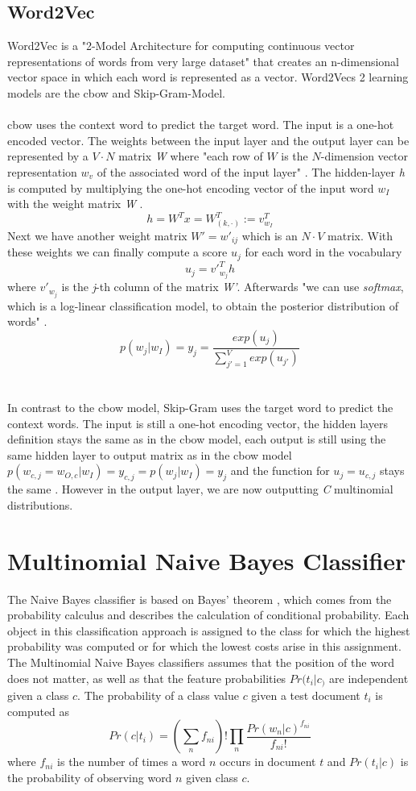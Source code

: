 \documentclass[a4paper, 11pt,titlepage,oneside,openany]{book}
\begin{document}
\subsection{Word2Vec}
Word2Vec is a "2-Model Architecture for computing continuous vector representations of words from very large dataset"\cite{effiecientestimation} that creates an n-dimensional vector space in which each word is represented as a vector. Word2Vecs 2 learning models are the \gls{cbow} and Skip-Gram-Model.\\
\\
\noindent \gls{cbow} uses the context word to predict the target word. The input is a one-hot encoded vector. The weights between the input layer and the output layer can be represented by a $V \cdot N$ matrix \textit{W} where "each row of $W$ is the $N$-dimension vector representation $w_v$ of the associated word of the input layer" \cite{word2vecparam}. The hidden-layer \textit{h} is computed by multiplying the one-hot encoding vector of the input word $w_I$ with the weight matrix \textit{W} \cite{word2vecparam}.
\[
h=W^Tx=W_{(k, \cdot)}^{T}:=v_{w_I}^{T}
\] 
Next we have another weight matrix $W'={w'_{ij}}$ which is an $N \cdot V$ matrix. With these weights we can finally compute a score $u_j$ for each word in the vocabulary \cite{word2vecparam}
\[
u_{j}={v'}_{w_j}^{T}h
\] where ${v'}_{w_j}$ is the \textit{j}-th column of the matrix \textit{W'}. Afterwards "we can use \textit{softmax}, which is a log-linear classification model, to obtain the posterior distribution of words" \cite{word2vecparam}.
\[
p(w_j|w_I)=y_j=\frac{exp(u_j)}{\sum_{j'=1}^V exp(u_{j'})}
\] \\
\\
\noindent In contrast to the \gls{cbow} model,  Skip-Gram uses the target word to predict the context words. The input is still a one-hot encoding vector, the hidden layers definition stays the same as in the \gls{cbow} model, each output is still using the same hidden layer to output matrix as in the \gls{cbow} model $p(w_{c,j}=w_{O,c}|w_I)=y_{c,j} = p(w_j|w_I)=y_j$ and the function for $u_j=u_{c,j}$ stays the same \cite{word2vecparam}. However in the output layer, we are now outputting \textit{C} multinomial distributions. 
\section{Multinomial Naive Bayes Classifier}
The Naive Bayes classifier is based on  Bayes' theorem \cite{btheory}, which comes from the probability calculus and describes the calculation of conditional probability. Each object in this classification approach is assigned to the class for which the highest probability was computed or for which the lowest costs arise in this assignment.  \\
\noindent The Multinomial Naive Bayes classifiers assumes that the position of the word does not matter, as well as  that the feature probabilities $Pr(t_i|c_)$ are independent given a class $c$.
The probability of a class value $c$ given a test document $t_i$ is computed as \cite{multinomialnb}
\[
Pr(c|t_i)=(\sum_{n}f_{ni})!\prod_{n}\frac{Pr(w_n|c)^{f_{ni}}}{f_{ni}!}
\]
where $f_{ni}$ is the number of times a word $n$ occurs in document $t$ and $Pr(t_i|c)$ is the probability of observing word $n$ given class $c$.
\end{document}
